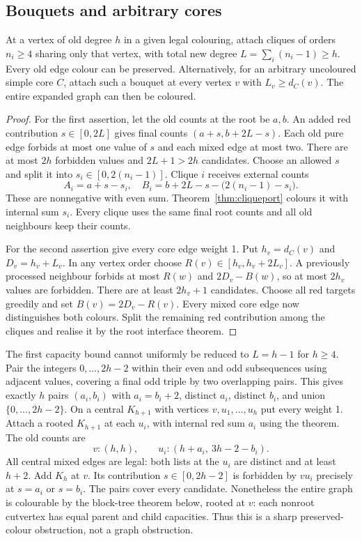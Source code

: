 \subsection{Bouquets and arbitrary cores}\label{sec:cliquecapacity}

\begin{theorem}[A8]\label{thm:bouquet}
At a vertex of old degree $h$ in a given legal colouring, attach
cliques of orders $n_i\ge4$ sharing only that vertex, with total
new degree $L=\sum_i(n_i-1)\ge h$. Every old edge colour can be
preserved. Alternatively, for an arbitrary uncoloured simple core
$C$, attach such a bouquet at every vertex $v$ with
$L_v\ge d_C(v)$. The entire expanded graph can then be coloured.
\end{theorem}
\begin{proof}
For the first assertion, let the old counts at the root be $a,b$.
An added red contribution $s\in[0,2L]$ gives final counts
$(a+s,b+2L-s)$. Each old pure edge forbids at most one value of
$s$ and each mixed edge at most two. There are at most $2h$
forbidden values and $2L+1>2h$ candidates. Choose an allowed $s$
and split it into $s_i\in[0,2(n_i-1)]$. Clique $i$ receives external
counts
\[
 A_i=a+s-s_i,\quad
 B_i=b+2L-s-\bigl(2(n_i-1)-s_i\bigr).
\]
These are nonnegative with even sum. Theorem~\ref{thm:cliqueport}
colours it with internal sum $s_i$. Every clique uses the same
final root counts and all old neighbours keep their counts.

For the second assertion give every core edge weight 1. Put
$h_v=d_C(v)$ and $D_v=h_v+L_v$. In any vertex order choose
$R(v)\in[h_v,h_v+2L_v]$. A previously processed neighbour forbids
at most $R(w)$ and $2D_v-B(w)$, so at most $2h_v$ values are
forbidden. There are at least $2h_v+1$ candidates. Choose all red
targets greedily and set $B(v)=2D_v-R(v)$. Every mixed core edge
now distinguishes both colours. Split the remaining red contribution
among the cliques and realise it by the root interface theorem.
\end{proof}

The first capacity bound cannot uniformly be reduced to $L=h-1$
for $h\ge4$. Pair the integers $0,\ldots,2h-2$ within their even
and odd subsequences using adjacent values, covering a final odd
triple by two overlapping pairs. This gives exactly $h$ pairs
$(a_i,b_i)$ with $a_i=b_i+2$, distinct $a_i$, distinct $b_i$, and
union $\{0,\ldots,2h-2\}$. On a central $K_{h+1}$ with vertices
$v,u_1,\ldots,u_h$ put every weight 1. Attach a rooted $K_{h+1}$
at each $u_i$, with internal red sum $a_i$ using the theorem.
The old counts are
\[
 v:(h,h),\qquad u_i:(h+a_i,\ 3h-2-b_i).
\]
All central mixed edges are legal: both lists at the $u_i$ are
distinct and at least $h+2$. Add $K_h$ at $v$. Its contribution
$s\in[0,2h-2]$ is forbidden by $vu_i$ precisely at $s=a_i$ or
$s=b_i$. The pairs cover every candidate. Nonetheless the entire
graph is colourable by the block-tree theorem below, rooted at $v$:
each nonroot cutvertex has equal parent and child capacities. Thus
this is a sharp preserved-colour obstruction, not a graph obstruction.

